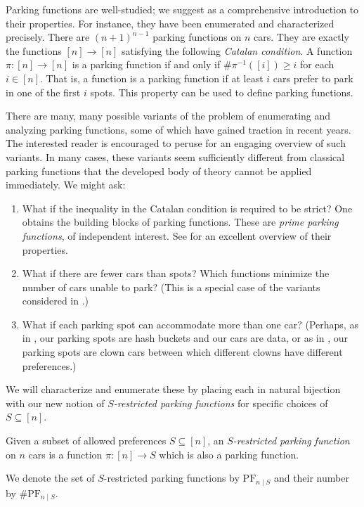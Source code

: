 \documentclass[12pt]{article}
\begin{document}
Parking functions are well-studied; we suggest \cite{yan-survey-2015} as a comprehensive introduction to their properties. For instance, they have been enumerated and characterized precisely. There are $(n + 1)^{n - 1}$ parking functions on $n$ cars. They are exactly the functions $[n] \to [n]$ satisfying the following \emph{Catalan condition}. A function $\pi : [n] \to [n]$ is a parking function if and only if $\#\pi^{-1}([i]) \ge i$ for each $i \in [n]$. That is, a function is a parking function if at least $i$ cars prefer to park in one of the first $i$ spots. This property can be used to define parking functions.

There are many, many possible variants of the problem of enumerating and analyzing parking functions, some of which have gained traction in recent years. The interested reader is encouraged to peruse \cite{carlson-harris-2020} for an engaging overview of such variants. In many cases, these variants seem sufficiently different from classical parking functions that the developed body of theory cannot be applied immediately. We might ask:
\begin{enumerate}
	\item What if the inequality in the Catalan condition is required to be strict? One obtains the building blocks of parking functions. These are \emph{prime parking functions}, of independent interest. See \cite{meyles-2023} for an excellent overview of their properties.
 	\item What if there are fewer cars than spots? Which functions minimize the number of cars unable to park? (This is a special case of the variants considered in \cite{cameron-johannsen-prellberg-schweitzer-2008}.)
	\item What if each parking spot can accommodate more than one car? (Perhaps, as in \cite{blake-konheim-1977}, our parking spots are hash buckets and our cars are data, or as in \cite{carlson-harris-2020}, our parking spots are clown cars between which different clowns have different preferences.)
\end{enumerate}
We will characterize and enumerate these by placing each in natural bijection with our new notion of \emph{$S$-restricted parking functions} for specific choices of $S \subseteq [n]$.

\begin{definition}
    Given a subset of allowed preferences $S \subseteq [n]$, an \emph{$S$-restricted parking function} on $n$ cars is a function $\pi : [n] \to S$ which is also a parking function. 

    We denote the set of $S$-restricted parking functions by $\mathrm{PF}_{n \mid S}$ and their number by $\# \mathrm{PF}_{n \mid S}$.
\end{definition}
\end{document}
